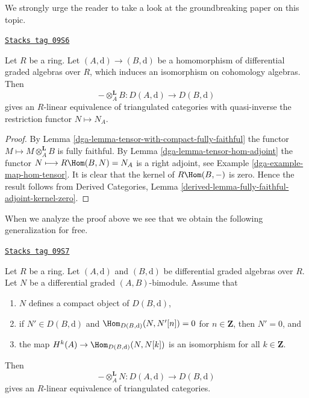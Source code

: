 \medskip\noindent
We strongly urge the reader to take a look at the groundbreaking
paper \cite{Rickard} on this topic.

\begin{lemma}
\label{dga-lemma-qis-equivalence}
\href{https://stacks.math.columbia.edu/tag/09S6}{\texttt{Stacks tag 09S6}}

Let $R$ be a ring. Let $(A, \text{d}) \to (B, \text{d})$ be a
homomorphism of differential graded algebras over $R$, which induces
an isomorphism on cohomology algebras. Then
$$
- \otimes_A^\mathbf{L} B : D(A, \text{d}) \to D(B, \text{d})
$$
gives an $R$-linear equivalence of triangulated categories with
quasi-inverse the restriction functor $N \mapsto N_A$.
\end{lemma}

\begin{proof}

By Lemma \ref{dga-lemma-tensor-with-compact-fully-faithful}
the functor $M \longmapsto M \otimes_A^\mathbf{L} B$ is
fully faithful. By Lemma \ref{dga-lemma-tensor-hom-adjoint}
the functor $N \longmapsto R\Hom(B, N) = N_A$ is a right adjoint, see
Example \ref{dga-example-map-hom-tensor}.
It is clear that the kernel of $R\Hom(B, -)$ is zero.
Hence the result follows from
Derived Categories, Lemma
\ref{derived-lemma-fully-faithful-adjoint-kernel-zero}.
\end{proof}

When we analyze the proof above we see that we obtain the
following generalization for free.

\begin{lemma}
\label{dga-lemma-tilting-equivalence}
\href{https://stacks.math.columbia.edu/tag/09S7}{\texttt{Stacks tag 09S7}}

Let $R$ be a ring. Let $(A, \text{d})$ and $(B, \text{d})$ be
differential graded algebras over $R$. Let $N$ be a
differential graded $(A, B)$-bimodule. Assume that
\begin{enumerate}
\item $N$ defines a compact object of $D(B, \text{d})$,
\item if $N' \in D(B, \text{d})$ and
$\Hom_{D(B, \text{d})}(N, N'[n]) = 0$ for $n \in \mathbf{Z}$,
then $N' = 0$, and
\item the map $H^k(A) \to \Hom_{D(B, \text{d})}(N, N[k])$ is an
isomorphism for all $k \in \mathbf{Z}$.
\end{enumerate}
Then
$$
- \otimes_A^\mathbf{L} N : D(A, \text{d}) \to D(B, \text{d})
$$
gives an $R$-linear equivalence of triangulated categories.
\end{lemma}

